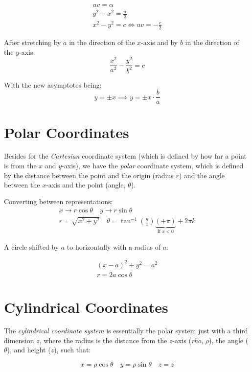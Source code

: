 \documentclass[00_complete]{subfiles}
\begin{document}
\begin{conclusion}
$$
\begin{gathered}
    uv = \alpha \\
    y^2 - x^2 = \frac{\alpha}{2} \\
    x^2 - y^2 = c \iff uv = -\frac{c}{2}
\end{gathered}
$$
\end{conclusion}

After stretching by $a$ in the direction of the $x$-axis and by $b$ in the
direction of the $y$-axis:
$$\frac{x^2}{a^2} - \frac{y^2}{b^2} = c$$

With the new asymptotes being:
$$y=\pm x \implies y=\pm x \cdot \frac{b}{a}$$

\section{Polar Coordinates}

Besides for the \emph{Cartesian} coordinate system (which is defined by how far a
point is from the $x$ and $y$-axis), we have the \emph{polar} coordinate system,
which is defined by the distance between the point and the origin (radius $r$) and
the angle between the $x$-axis and the point (angle, $\theta$).

Converting between representations:
$$
\begin{gathered}
  x \to r \cos \theta \quad y \to r \sin \theta \\
  r = \sqrt{x^2+y^2} \quad \theta = \tan^{-1}\left(\frac{y}{x}\right)\underbrace{(+ \pi)}_{\text{If $x<0$}} +2 \pi k
\end{gathered}
$$

A circle shifted by $a$ to horizontally with a radius of $a$:

$$
\begin{gathered}
    (x-a)^2+y^2=a^2 \\
    r = 2a \cos \theta
\end{gathered}
$$

\section{Cylindrical Coordinates}

The \emph{cylindrical coordinate system} is essentially the polar system just with a
third dimension $z$, where the radius is the distance from the $z$-axis
(\emph{rho}, $\rho$), the angle ($\theta$), and height ($z$), such that:

$$x = \rho \cos \theta \quad y = \rho \sin \theta \quad z = z$$
\end{document}
